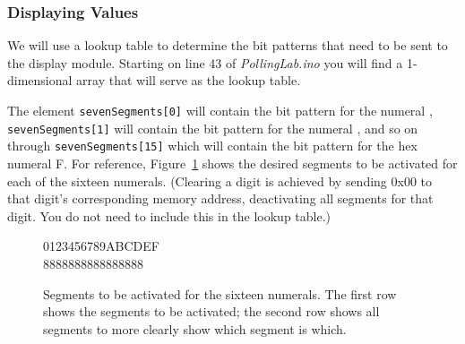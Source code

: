 \subsubsection{Displaying Values}

We will use a lookup table to determine the bit patterns that need to be sent
to the display module. Starting on line 43 of \textit{PollingLab.ino} you will
find a 1-dimensional array that will serve as the lookup table.

The element \lstinline{sevenSegments[0]} will contain the bit pattern for the
numeral {},  \lstinline{sevenSegments[1]} will contain the bit
pattern for the numeral {}, and so on through
\lstinline{sevenSegments[15]} which will contain the bit pattern for the hex
numeral {\dviiseg F}. For reference, Figure~\ref{fig:SevenSegmentNumerals}
shows the desired segments to be activated for each of the sixteen numerals.
(Clearing a digit is achieved by sending 0x00 to that digit's corresponding
memory address, deactivating all segments for that digit. You do not need to
include this in the lookup table.)

\begin{figure}
    \centering
    {\dviiseg \huge 0123456789ABCDEF \\ \vspace{0.1cm}
                   8888888888888888}
    \caption{Segments to be activated for the sixteen numerals. The first row shows the segments to be activated; the second row shows all segments to more clearly show which segment is which. \label{fig:SevenSegmentNumerals}}
\end{figure}

